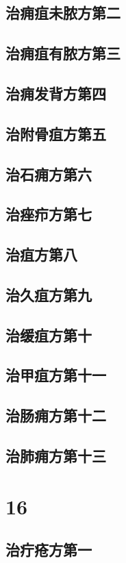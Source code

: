 \documentclass[a4paper,12pt,UTF8,twoside]{ctexbook}
\begin{document}
\chapter{治痈疽未脓方第二}
\chapter{治痈疽有脓方第三}
\chapter{治痈发背方第四}
\chapter{治附骨疽方第五}
\chapter{治石痈方第六}
\chapter{治痤疖方第七}
\chapter{治疽方第八}
\chapter{治久疽方第九}
\chapter{治缓疽方第十}
\chapter{治甲疽方第十一}
\chapter{治肠痈方第十二}
\chapter{治肺痈方第十三}

\part{16}
\chapter{治疔疮方第一}
\end{document}
